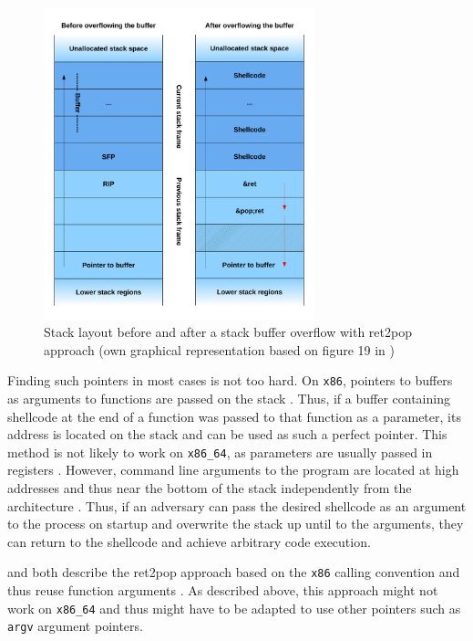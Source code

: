 \begin{figure}[htb]
	\centering
	\includegraphics[width=0.7\textwidth]{figures/ret2pop}
	\caption{Stack layout before and after a stack buffer overflow with ret2pop approach (own graphical representation based on figure 19 in \cite[12]{Mueller2008})}
	\label{fig:ret2pop}
\end{figure}

Finding such pointers in most cases is not too hard.
On \texttt{x86}, pointers to buffers as arguments to functions are passed on the stack \cites[11\psq]{Lu2015}[17\psqq]{Fog2019}.
Thus, if a buffer containing shellcode at the end of a function was passed to that function as a parameter, its address is located on the stack and can be used as such a perfect pointer.
This method is not likely to work on \texttt{x86\_64}, as parameters are usually passed in registers \cites[19\psqq]{Lu2018}[17\psqq]{Fog2019}.
However, command line arguments to the program are located at high addresses and thus near the bottom of the stack independently from the architecture \cites[18\psqq]{Lu2015}[31\psqq]{Lu2018}.
Thus, if an adversary can pass the desired shellcode as an argument to the process on startup and overwrite the stack up until to the arguments, they can return to the shellcode and achieve arbitrary code execution.

 and \citeauthor{Mueller2008} both describe the ret2pop approach based on the \texttt{x86} calling convention and thus reuse function arguments \cites{Kotler2005}[11\psq]{Mueller2008}.
As described above, this approach might not work on \texttt{x86\_64} and thus might have to be adapted to use other pointers such as \texttt{argv} argument pointers.

